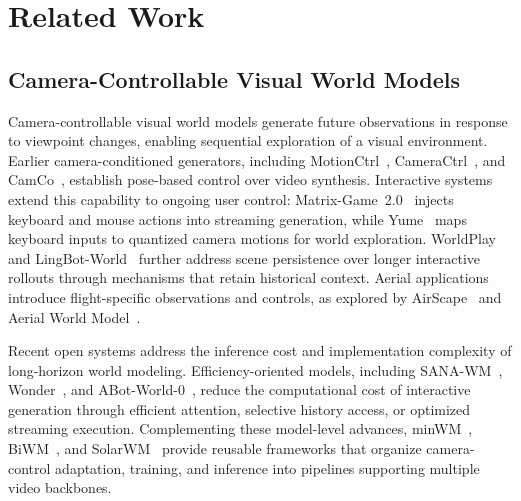 \section{Related Work}
\label{sec:related_work}

\subsection{Camera-Controllable Visual World Models}
\label{sec:rw_camera_models}

Camera-controllable visual world models generate future observations in response to viewpoint changes, enabling sequential exploration of a visual environment.
Earlier camera-conditioned generators, including MotionCtrl~\cite{wang2024motionctrlunifiedflexiblemotion}, CameraCtrl~\cite{he2025cameractrlenablingcameracontrol}, and CamCo~\cite{xu2024camcocameracontrollable3dconsistentimagetovideo}, establish pose-based control over video synthesis.
Interactive systems extend this capability to ongoing user control: Matrix-Game~2.0~\cite{he2026matrixgame20opensourcerealtime} injects keyboard and mouse actions into streaming generation, while Yume~\cite{mao2025yumeinteractiveworldgeneration} maps keyboard inputs to quantized camera motions for world exploration.
WorldPlay~\cite{sun2026worldplaylongtermgeometricconsistency} and LingBot-World~\cite{robbyantteam2026advancingopensourceworldmodels} further address scene persistence over longer interactive rollouts through mechanisms that retain historical context.
Aerial applications introduce flight-specific observations and controls, as explored by AirScape~\cite{zhao2025airscapeaerialgenerativeworld} and Aerial World Model~\cite{zhang2026aerialworldmodellonghorizon}.

Recent open systems address the inference cost and implementation complexity of long-horizon world modeling.
Efficiency-oriented models, including SANA-WM~\cite{zhu2026sanawmefficientminutescaleworld}, Wonder~\cite{xu2026wondervideoworldmodel}, and ABot-World-0~\cite{jiang2026abotworld0infiniteinteractiveworld}, reduce the computational cost of interactive generation through efficient attention, selective history access, or optimized streaming execution.
Complementing these model-level advances, minWM~\cite{zhao2026minwmfullstackopensourceframework}, BiWM~\cite{rui2026biwmadvancingopensourceinteractive}, and SolarWM~\cite{huang2026solarwmopendatascalable} provide reusable frameworks that organize camera-control adaptation, training, and inference into pipelines supporting multiple video backbones.

